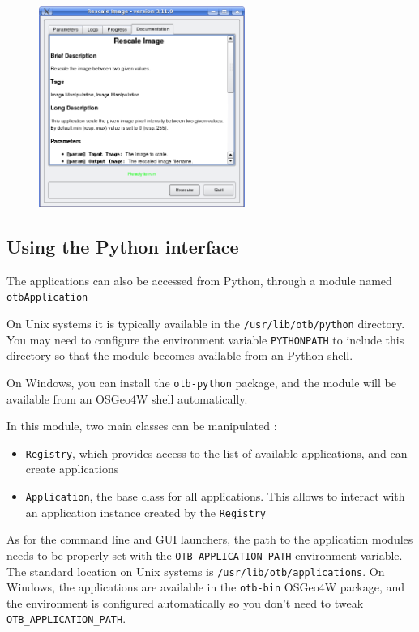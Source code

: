 \begin{figure}[h]
  \center
  \includegraphics[width=0.6\textwidth]{../Art/QtImages/rescale_documentation.png}
  \label{fig:rescaleDocumentation}
\end{figure}

\clearpage

\subsection{Using the Python interface}

The applications can also be accessed from Python, through a module named \verb?otbApplication?

On Unix systems it is typically available in the \verb?/usr/lib/otb/python? directory.
You may need to configure the environment variable \verb?PYTHONPATH? to include this directory
so that the module becomes available from an Python shell.

On Windows, you can install the \verb?otb-python? package, and the module will be available from
an OSGeo4W shell automatically.

In this module, two main classes can be manipulated :
\begin{itemize}
\item \verb?Registry?, which provides access to the list of available applications,
      and can create applications
\item \verb?Application?, the base class for all applications. This allows to interact with an application instance
      created by the \verb?Registry?
\end{itemize}

As for the command line and GUI launchers, the path to the application modules needs to
be properly set with the \verb?OTB_APPLICATION_PATH? environment variable.
The standard location on Unix systems is \verb?/usr/lib/otb/applications?.
On Windows, the applications are available in the \verb?otb-bin? OSGeo4W package, and
the environment is configured automatically so you don't need to tweak \verb?OTB_APPLICATION_PATH?.

